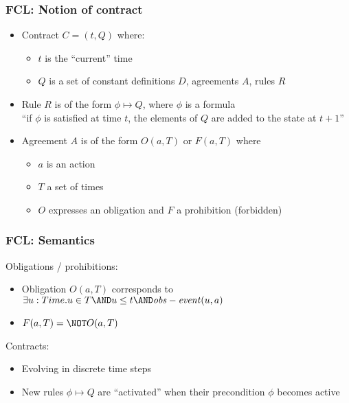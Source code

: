 \documentclass{beamer}
\begin{document}
\begin{frame}[fragile]\frametitle{FCL: Notion of contract}



  \begin{itemize}
  \item Contract $C = (t, Q)$ where:
    \begin{itemize}
    \item $t$ is the ``current'' time
    \item $Q$ is a set of constant definitions $D$, agreements $A$, rules $R$
    \end{itemize}
    
  \item Rule $R$ is of the form $\phi \mapsto Q$, where $\phi$ is a formula\\
    ``if $\phi$ is satisfied at time $t$, the elements of $Q$ are added to the
    state at $t+1$''

  \item Agreement $A$ is of the form $O(a, T)$ or $F(a, T)$ where
    \begin{itemize}
    \item $a$ is an action
    \item $T$ a set of times
    \item $O$ expresses an obligation and $F$ a prohibition (forbidden)
    \end{itemize}
  \end{itemize}

\end{frame}

\begin{frame}[fragile]\frametitle{FCL: Semantics}


  Obligations / prohibitions:
  \begin{itemize}
  \item   Obligation $O(a, T)$ corresponds to\\
    $\exists u : Time. u \in T \AND u \leq t \AND \mathit{obs-event}(u,a)$
  \item  $F(a, T) = \NOT O(a, T)$
  \end{itemize}
  
  Contracts:
  \begin{itemize}
  \item Evolving in discrete time steps
  \item New rules $\phi \mapsto Q$ are ``activated'' when their precondition
    $\phi$ becomes active
  \end{itemize}


\end{frame}
\end{document}
